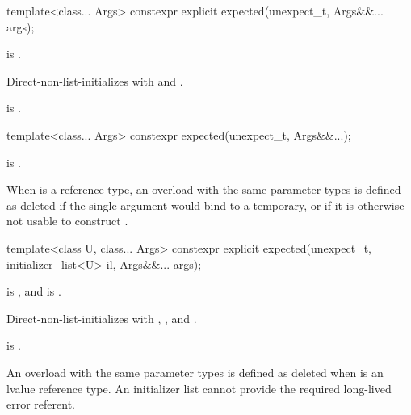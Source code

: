 %
\begin{itemdecl}
template<class... Args> constexpr explicit expected(unexpect_t, Args&&... args);
\end{itemdecl}

\begin{itemdescr}
\pnum
\constraints
{} is .

\pnum
\effects
Direct-non-list-initializes  with  and .

\pnum
\ensures
{} is .
\end{itemdescr}

%
\begin{itemdecl}
template<class... Args> constexpr expected(unexpect_t, Args&&...);
\end{itemdecl}

\begin{itemdescr}
\pnum
\constraints
{} is .

\pnum
\remarks
When  is a reference type, an overload with the same parameter types is defined as deleted if the single argument would bind  to a temporary, or if it is otherwise not usable to construct .
\end{itemdescr}

%
\begin{itemdecl}
template<class U, class... Args>
constexpr explicit expected(unexpect_t, initializer_list<U> il, Args&&... args);
\end{itemdecl}

\begin{itemdescr}
\pnum
\constraints
{} is , and  is .

\pnum
\effects
Direct-non-list-initializes  with , , and .

\pnum
\ensures
{} is .

\pnum
\remarks
An overload with the same parameter types is defined as deleted when  is an lvalue reference type. An initializer list cannot provide the required long-lived error referent.
\end{itemdescr}

